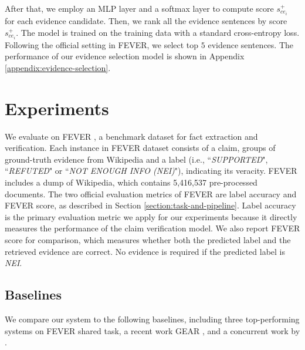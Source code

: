 \documentclass[11pt,a4paper]{article}
\begin{document}
After that, we employ an MLP layer and a softmax layer to compute score $s^{+}_{ce_i}$ for each evidence candidate.
Then, we rank all the evidence sentences by score $s^{+}_{ce_i}$. The model is trained on the training data with a standard cross-entropy loss. Following the official setting in FEVER, we select top $5$ evidence sentences. The performance of our evidence selection model is shown in Appendix \ref{appendix:evidence-selection}.

\section{Experiments}
We evaluate on FEVER \cite{thorne2018fever}, a benchmark dataset for fact extraction and verification. 
Each instance in FEVER dataset consists of a claim, groups of ground-truth evidence from Wikipedia and a label (i.e., 
``\textsl{SUPPORTED}", ``\textsl{REFUTED}" or ``\textsl{NOT ENOUGH INFO (NEI)}"),
indicating its veracity. 
FEVER includes a dump of Wikipedia, which contains 5,416,537 pre-processed documents. 
The two official evaluation metrics of FEVER are {label accuracy} and {FEVER score}, as described in Section \ref{section:task-and-pipeline}.
Label accuracy is the primary evaluation metric we apply for our experiments because it directly measures the performance of the claim verification model. 
We also report FEVER score for comparison, which measures whether both the predicted label and the retrieved evidence are correct. 
No evidence is required if the predicted label is \textsl{NEI}.




\subsection{Baselines}


We compare our system to the following baselines, including three top-performing systems on FEVER shared task, a recent work GEAR \cite{zhou-etal-2019-gear}, and
a concurrent work by .
\end{document}
